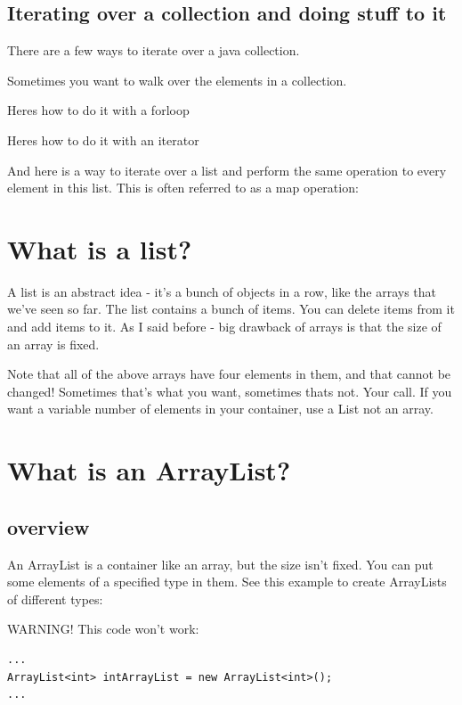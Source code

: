 \documentclass[10pt]{article}
\begin{document}
\subsection{Iterating over a collection and doing stuff to it}
There are a few ways to iterate over a java collection. 

Sometimes you want to walk over the elements in a collection.

Heres how to do it with a forloop



Heres how to do it with an iterator



And here is a way to iterate over a list and perform the same operation to every
element in this list. This is often referred to as a map operation:



\section{What is a list?}
A list is an abstract idea - it's a bunch of objects in a row, like the arrays that we've seen so far. The list contains a bunch of items. You can delete items from it and add items to it. As I said before - big drawback of arrays is that the size of an array is fixed.



Note that all of the above arrays have four elements in them, and that cannot be changed! Sometimes that's what you want, sometimes thats not. Your call. If you want a variable number of elements in your container, use a List not an array.

\section{What is an ArrayList?}
\subsection{overview}
An ArrayList is a container like an array, but the size isn't fixed. You can put some elements of a specified type in them. See this example to create ArrayLists of different types:



WARNING! This code won't work:
\begin{lstlisting}[style=java]
...
ArrayList<int> intArrayList = new ArrayList<int>();
...
\end{lstlisting}
\end{document}
